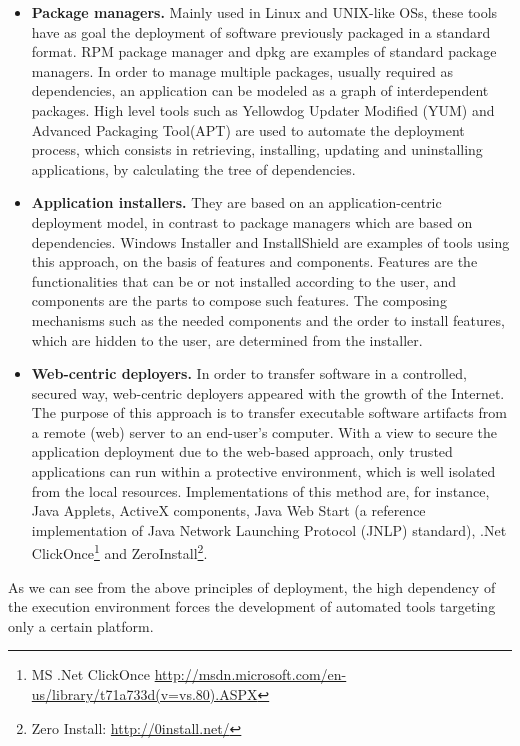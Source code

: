 \begin{itemize}
	\item \textbf{Package managers.} Mainly used in Linux and UNIX-like OSs, these tools have as goal the deployment of software previously packaged in a standard format. 
	RPM package manager\cite{bailey1997maximum} and dpkg\cite{murdock1994overview} are examples of standard package managers.
	In order to manage multiple packages, usually required as dependencies, an application can be modeled as a graph of interdependent packages.
	High level tools such as Yellowdog Updater Modified (YUM)\cite{vidalyellow} and Advanced Packaging Tool(APT)\cite{silva2001apt} are used to automate the deployment process, which consists in retrieving, installing, updating and uninstalling applications, by calculating the tree of dependencies.
	\item \textbf{Application installers.} They are based on an application-centric deployment model, in contrast to package managers which are based on dependencies.
	Windows Installer\cite{kelly1998gain} and InstallShield\cite{baker2001official} are examples of tools using this approach, on the basis of features and components.
	Features are the functionalities that can be or not installed according to the user, and components are the parts to compose such features.
	The composing mechanisms such as the needed components and the order to install features, which are hidden to the user, are determined from the installer.
	\item \textbf{Web-centric deployers.} In order to transfer software in a controlled, secured way, web-centric deployers appeared with the growth of the Internet.
	The purpose of this approach is to transfer executable software artifacts from a remote (web) server to an end-user's computer.
	With a view to secure the application deployment due to the web-based approach, only trusted applications can run within a protective environment, which is well isolated from the local resources.
	Implementations of this method are, for instance, Java Applets, ActiveX components, Java Web Start (a reference implementation of Java Network Launching Protocol (JNLP) standard), .Net ClickOnce\footnote{MS .Net ClickOnce \url{http://msdn.microsoft.com/en-us/library/t71a733d(v=vs.80).ASPX}} and ZeroInstall\footnote{Zero Install: \url{http://0install.net/}}.
\end{itemize}
As we can see from the above principles of deployment, the high dependency of the execution environment forces the development of automated tools targeting only a certain platform.
